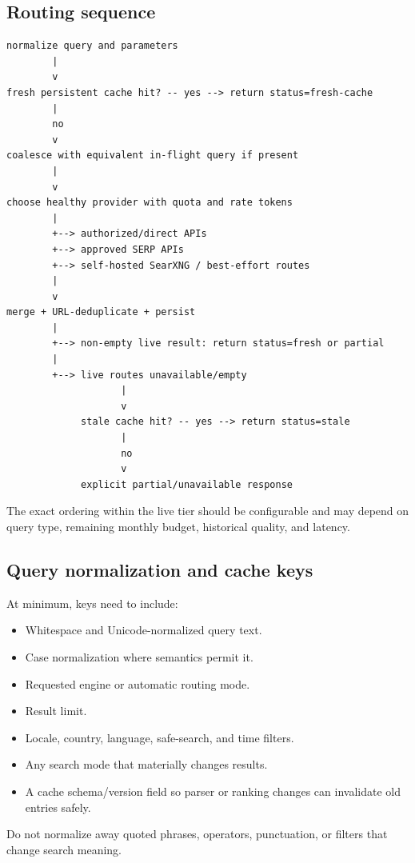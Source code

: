 \documentclass[11pt]{article}
\begin{document}
\subsection*{Routing sequence}
\label{sec:org35a29f4}

\begin{verbatim}
normalize query and parameters
        |
        v
fresh persistent cache hit? -- yes --> return status=fresh-cache
        |
        no
        v
coalesce with equivalent in-flight query if present
        |
        v
choose healthy provider with quota and rate tokens
        |
        +--> authorized/direct APIs
        +--> approved SERP APIs
        +--> self-hosted SearXNG / best-effort routes
        |
        v
merge + URL-deduplicate + persist
        |
        +--> non-empty live result: return status=fresh or partial
        |
        +--> live routes unavailable/empty
                    |
                    v
             stale cache hit? -- yes --> return status=stale
                    |
                    no
                    v
             explicit partial/unavailable response
\end{verbatim}

The exact ordering within the live tier should be configurable and may depend
on query type, remaining monthly budget, historical quality, and latency.
\subsection*{Query normalization and cache keys}
\label{sec:org043906f}

At minimum, keys need to include:

\begin{itemize}
\item Whitespace and Unicode-normalized query text.
\item Case normalization where semantics permit it.
\item Requested engine or automatic routing mode.
\item Result limit.
\item Locale, country, language, safe-search, and time filters.
\item Any search mode that materially changes results.
\item A cache schema/version field so parser or ranking changes can invalidate old
entries safely.
\end{itemize}

Do not normalize away quoted phrases, operators, punctuation, or filters that
change search meaning.
\end{document}
